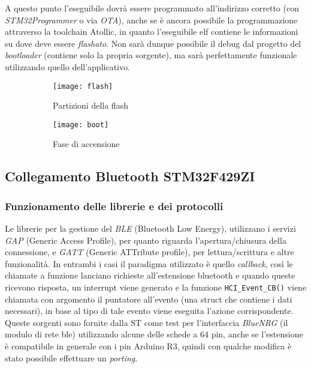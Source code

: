 A questo punto l'eseguibile dovr\`a essere programmato all'indirizzo corretto (con \textit{STM32Programmer} o via \textit{OTA}), anche se \`e ancora possibile la programmazione attraverso la toolchain Atollic, in quanto l'eseguibile elf contiene le informazioni su dove deve essere \textit{flashato}. Non sar\`a dunque possibile il debug dal progetto del \textit{bootloader} (contiene solo la propria sorgente), ma sar\`a perfettamente funzionale utilizzando quello dell'applicativo.

\begin{figure}[ht]
  \vspace{15pt}
  \center
  \begin{subfigure}{.45\textwidth}
    \texttt{[image: flash]}
    \caption{Partizioni della flash}
  \end{subfigure}
  \hfill
  \begin{subfigure}{.45\textwidth}
    \texttt{[image: boot]}
    \caption{Fase di accensione}
  \end{subfigure}
  \caption{}
\end{figure}


\subsection{Collegamento Bluetooth STM32F429ZI}

\subsubsection{Funzionamento delle librerie e dei protocolli}

Le librerie per la gestione del \textit{BLE} (Bluetooth Low Energy), utilizzano i servizi \textit{GAP} (Generic Access Profile), per quanto riguarda l'apertura/chiusura della connessione, e \textit{GATT} (Generic ATTribute profile), per lettura/scrittura e altre funzionalit\`a. In entrambi i casi il paradigma utilizzato \`e quello \textit{callback}, cos\`i le chiamate a funzione lanciano richieste all'estensione bluetooth e quando queste ricevono risposta, un interrupt viene generato e la funzione \texttt{HCI\_Event\_CB()} viene chiamata con argomento il puntatore all'evento (una struct che contiene i dati necessari), in base al tipo di tale evento viene eseguita l'azione corrispondente.
Queste sorgenti sono fornite dalla ST come test per l'interfaccia \textit{BlueNRG} (il modulo di rete ble) utilizzando alcune delle schede a 64 pin, anche se l'estensione \`e compatibile in generale con i pin Arduino R3, quindi con qualche modifica \`e stato possibile effettuare un \textit{porting}.

